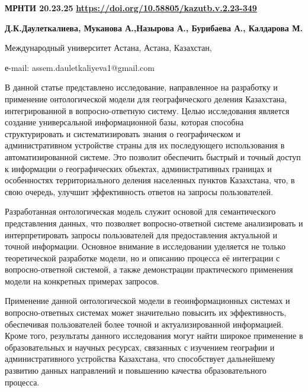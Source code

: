 \newpage
{\bfseries МРНТИ 20.23.25}
\hfill {\bfseries \href{https://doi.org/10.58805/kazutb.v.2.23-349}{https://doi.org/10.58805/kazutb.v.2.23-349}}


\begin{center}
{\bfseries Д.К.Даулеткалиева\envelope, Муканова А.,Назырова А., Бурибаева А., Калдарова М.}

Международный университет Астана, Астана, Казахстан,

е-mail: assem.dauletkaliyeva1@gmail.com
\end{center}

В данной статье представлено исследование, направленное на разработку и
применение онтологической модели для географического деления Казахстана,
интегрированной в вопросно-ответную систему. Целью исследования является
создание универсальной информационной базы, которая способна
структурировать и систематизировать знания о географическом и
административном устройстве страны для их последующего использования в
автоматизированной системе. Это позволит обеспечить быстрый и точный
доступ к информации о географических объектах, административных границах
и особенностях территориального деления населенных пунктов Казахстана,
что, в свою очередь, улучшит эффективность ответов на запросы
пользователей.

Разработанная онтологическая модель служит основой для семантического
представления данных, что позволяет вопросно-ответной системе
анализировать и интерпретировать запросы пользователей для
предоставления актуальной и точной информации. Основное внимание в
исследовании уделяется не только теоретической разработке модели, но и
описанию процесса её интеграции с вопросно-ответной системой, а также
демонстрации практического применения модели на конкретных примерах
запросов.

Применение данной онтологической модели в геоинформационных системах и
вопросно-ответных системах может значительно повысить их эффективность,
обеспечивая пользователей более точной и актуализированной информацией.
Кроме того, результаты данного исследования могут найти широкое
применение в образовательных и научных ресурсах, связанных с изучением
географии и административного устройства Казахстана, что способствует
дальнейшему развитию данных направлений и повышению качества
образовательного процесса.

